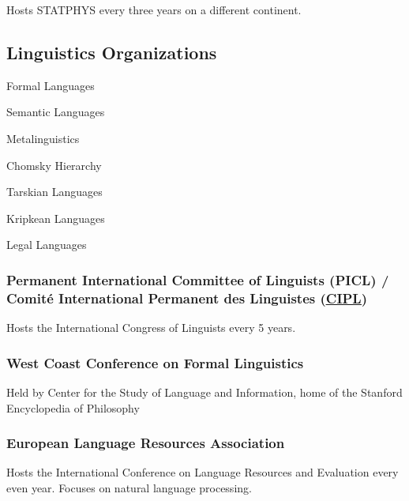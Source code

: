 Hosts STATPHYS every three years on a different continent.

\hypertarget{linguistics-organizations}{%
\subsection{Linguistics Organizations}\label{linguistics-organizations}}

Formal Languages

Semantic Languages

Metalinguistics

Chomsky Hierarchy

Tarskian Languages

Kripkean Languages

Legal Languages

\hypertarget{permanent-international-committee-of-linguists-picl-comituxe9-international-permanent-des-linguistes-cipl}{%
\subsubsection{\texorpdfstring{Permanent International Committee of
Linguists (PICL) / Comité International Permanent des Linguistes
(\href{http://www.ciplnet.com}{\ul{CIPL}})}{Permanent International Committee of Linguists (PICL) / Comité International Permanent des Linguistes (CIPL)}}\label{permanent-international-committee-of-linguists-picl-comituxe9-international-permanent-des-linguistes-cipl}}

Hosts the International Congress of Linguists every 5 years.

\hypertarget{west-coast-conference-on-formal-linguistics}{%
\subsubsection{West Coast Conference on Formal
Linguistics}\label{west-coast-conference-on-formal-linguistics}}

Held by Center for the Study of Language and Information, home of the
Stanford Encyclopedia of Philosophy

\hypertarget{european-language-resources-association}{%
\subsubsection{European Language Resources
Association}\label{european-language-resources-association}}

Hosts the International Conference on Language Resources and Evaluation
every even year. Focuses on natural language processing.

